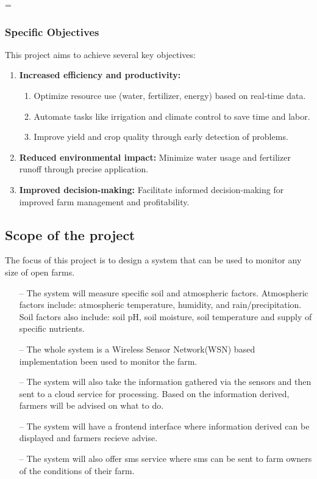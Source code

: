 =\documentclass[12pt, a4paper]{article}
\begin{document}
\subsubsection{Specific Objectives}
This project aims to achieve several key objectives:\\
\begin{enumerate}
\item \textbf{Increased efficiency and productivity:}
\begin{enumerate}
 \item Optimize resource use (water, fertilizer, energy) based on real-time data.
 \item Automate tasks like irrigation and climate control to save time and labor.
 \item Improve yield and crop quality through early detection of problems.
\end{enumerate}
 
\item \textbf{Reduced environmental impact:} Minimize water usage and fertilizer runoff through precise application.\\
\item \textbf{Improved decision-making:} Facilitate informed decision-making for improved farm management and profitability.
\end{enumerate}

\newpage
\subsection{Scope of the project}
The focus of this project is to design a system that can be used to monitor any size of open farms.
\begin{itemize}
\item[--] The system will measure specific soil and atmospheric factors. Atmospheric factors include: atmospheric temperature, humidity, and rain/precipitation. Soil factors also include: soil pH, soil moisture, soil temperature and supply of specific nutrients.
\item[--] The whole system is a Wireless Sensor Network(WSN) based implementation been used to  monitor the farm.
\item[--] The system will also take the information gathered via the sensors and then sent to a cloud service for processing. Based on the information derived, farmers will be advised on what to do.
\item[--] The system will have a frontend interface where information derived can be displayed and farmers recieve advise.
\item[--] The system will also offer sms service where sms can be sent to farm owners of the conditions of their farm. 
\end{itemize}
\end{document}
